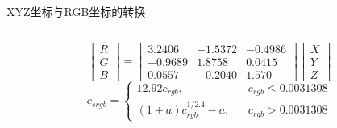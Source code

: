 \documentclass{beamer}
\begin{document}
\begin{frame}[t]{XYZ坐标与RGB坐标的转换}
\begin{columns}
\begin{column}[c]{0.65\textwidth}
\begin{minipage}[c][0.8\textheight][c]{\linewidth}
\begin{equation*}
			\left[\begin{array}{c}
			R\\G\\B
			\end{array}
			\right]=
			\begin{bmatrix}
			3.2406 & -1.5372 & -0.4986\\
			-0.9689 & 1.8758 & 0.0415\\
			0.0557 & -0.2040 & 1.570
			\end{bmatrix}
			\begin{bmatrix}
			X\\Y\\Z
			\end{bmatrix}
		\end{equation*}
		\begin{equation*}
			c_{srgb} = \left\{
			\begin{array}{lcc}
			12.92c_{rgb}, &     & c_{rgb}\le0.0031308\\
			(1+a)c_{rgb}^{1/2.4}-a,&     & c_{rgb}>0.0031308
			\end{array}
			\right.
		\end{equation*}
		\end{minipage}
	\end{column}	
\end{columns}
\end{frame}
\end{document}
